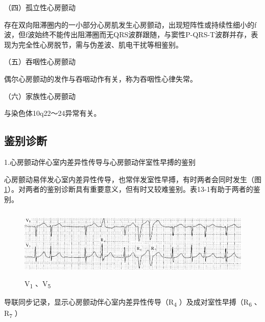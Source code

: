 （四）孤立性心房颤动

存在双向阻滞圈内的一小部分心房肌发生心房颤动，出现短阵性或持续性细小的f波，但f波始终不能传出阻滞圈而无QRS波群跟随，与窦性P-QRS-T波群并存，表现为完全性心房脱节，需与伪差波、肌电干扰等相鉴别。

（五）吞咽性心房颤动

偶尔心房颤动的发作与吞咽动作有关，称为吞咽性心律失常。

（六）家族性心房颤动

与染色体10q22～24异常有关。

\protect\hypertarget{text00020.htmlux5cux23subid211}{}{}

\subsection{鉴别诊断}

1.心房颤动伴心室内差异性传导与心房颤动伴室性早搏的鉴别

心房颤动易伴发心室内差异性传导，也常伴发室性早搏，有时两者会同时发生（图\ref{fig13-30}）。对两者的鉴别诊断具有重要意义，但有时又较难鉴别。表13-1有助于两者的鉴别。

\begin{figure}[!htbp]
 \centering
 \includegraphics[width=5.58333in,height=1.32292in]{./images/Image00238.jpg}
 \captionsetup{justification=centering}
 \caption{V\textsubscript{1} 、V\textsubscript{5}}
 \label{fig13-30}
  \end{figure} 
导联同步记录，显示心房颤动伴心室内差异性传导（R\textsubscript{4}
）及成对室性早搏（R\textsubscript{6} 、R\textsubscript{7} ）


